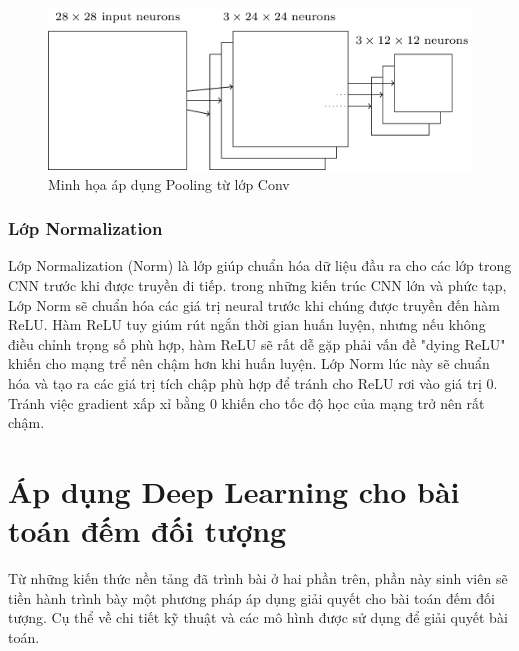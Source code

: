 \begin{figure}[ht]
  			\begin{center}
    				\includegraphics[scale=0.7]{pooling} 
    				\caption{Minh họa áp dụng Pooling từ lớp Conv}
    				\label{pooling}
  			\end{center}
\end{figure}	
	

\subsubsection{Lớp Normalization}
	Lớp Normalization (Norm) là lớp giúp chuẩn hóa dữ liệu đầu ra cho các lớp trong CNN trước khi được truyền đi tiếp. trong những kiến trúc CNN lớn và phức tạp, Lớp Norm sẽ chuẩn hóa các giá trị neural trước khi chúng được truyền đến hàm ReLU. Hàm ReLU tuy giúm rút ngắn thời gian huấn luyện, nhưng nếu không điều chỉnh trọng số phù hợp, hàm ReLU sẽ rất dễ gặp phải vấn đề "dying ReLU" khiến cho mạng trể nên chậm hơn khi huấn luyện. Lớp Norm lúc này sẽ chuẩn hóa và tạo ra các giá trị tích chập phù hợp để tránh cho ReLU rơi vào giá trị 0. Tránh việc gradient xấp xỉ bằng 0 khiến cho tốc độ học của mạng trở nên rất chậm.

\section{Áp dụng Deep Learning cho bài toán đếm đối tượng}
	Từ những kiến thức nền tảng đã trình bài ở hai phần trên, phần này sinh viên sẽ tiền hành trình bày một phương pháp áp dụng giải quyết cho bài toán đếm đối tượng. Cụ thể về chi tiết kỹ thuật và các mô hình được sử dụng để giải quyết bài toán. 
